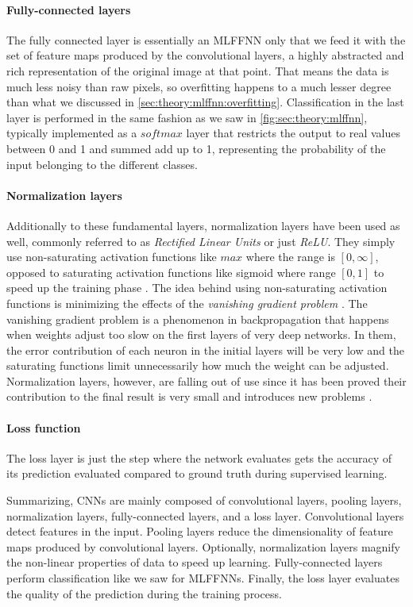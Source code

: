 \paragraph{Fully-connected layers}
The fully connected layer is essentially an MLFFNN only that we feed it with the set of feature maps produced by the convolutional layers, a highly abstracted and rich representation of the original image at that point.
That means the data is much less noisy than raw pixels, so overfitting happens to a much lesser degree than what we discussed in \autoref{sec:theory:mlffnn:overfitting}.
Classification in the last layer is performed in the same fashion as we saw in \autoref{fig:sec:theory:mlffnn}, typically implemented as a $softmax$ layer that restricts the output to real values between 0 and 1 and summed add up to 1, representing the probability of the input belonging to the different classes.

\paragraph{Normalization layers}
Additionally to these fundamental layers, normalization layers have been used as well, commonly referred to as \emph{Rectified Linear Units} or just \emph{ReLU}.
They simply use non-saturating activation functions like $max$ where the range is $[0,\infty]$, opposed to saturating activation functions like sigmoid where range $[0,1]$ to speed up the training phase \cite{Krizhevsky2012,Nair2010}.
The idea behind using non-saturating activation functions is minimizing the effects of the \emph{vanishing gradient problem} \cite{Socher2015}.
The vanishing gradient problem is a phenomenon in backpropagation that happens when weights adjust too slow on the first layers of very deep networks.
In them, the error contribution of each neuron in the initial layers will be very low and the saturating functions limit unnecessarily how much the weight can be adjusted.
Normalization layers, however, are falling out of use since it has been proved their contribution to the final result is very small and introduces new problems \cite{Lo2015}.

\paragraph{Loss function}
The loss layer is just the step where the network evaluates gets the accuracy of its prediction evaluated compared to ground truth during supervised learning.

Summarizing, CNNs are mainly composed of convolutional layers, pooling layers, normalization layers, fully-connected layers, and a loss layer.
Convolutional layers detect features in the input.
Pooling layers reduce the dimensionality of feature maps produced by convolutional layers.
Optionally, normalization layers magnify the non-linear properties of data to speed up learning.
Fully-connected layers perform classification like we saw for MLFFNNs.
Finally, the loss layer evaluates the quality of the prediction during the training process.


